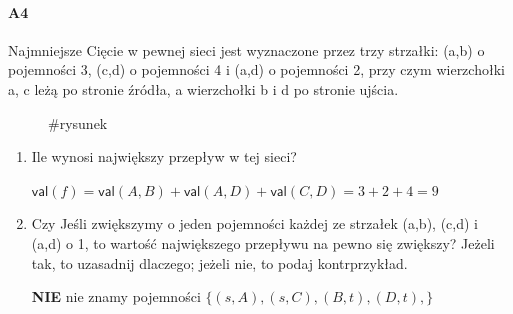 \paragraph{A4} Najmniejsze Cięcie w pewnej sieci jest wyznaczone przez trzy strzałki: (a,b) o pojemności 3, (c,d) o
pojemności 4 i (a,d) o pojemności 2, przy czym wierzchołki a, c leżą po stronie źródła, a wierzchołki b i d
po stronie ujścia.
\begin{figure}[H]
\centering
{}
\caption*{\#rysunek}
\end{figure}
\begin{enumerate}[label=\alph*)]
\item Ile wynosi największy przepływ w tej sieci?

$\mathsf{val}(f)=\mathsf{val}(A,B)+\mathsf{val}(A,D)+\mathsf{val}(C,D)=3+2+4=9$
\item Czy Jeśli zwiększymy o jeden pojemności każdej ze strzałek (a,b), (c,d) i (a,d) o 1, to wartość największego przepływu na pewno się zwiększy? Jeżeli tak, to uzasadnij dlaczego; jeżeli nie, to podaj kontrprzykład.

\textbf{NIE} nie znamy pojemności $\{(s,A),(s,C),(B,t),(D,t),\}$
\end{enumerate}


